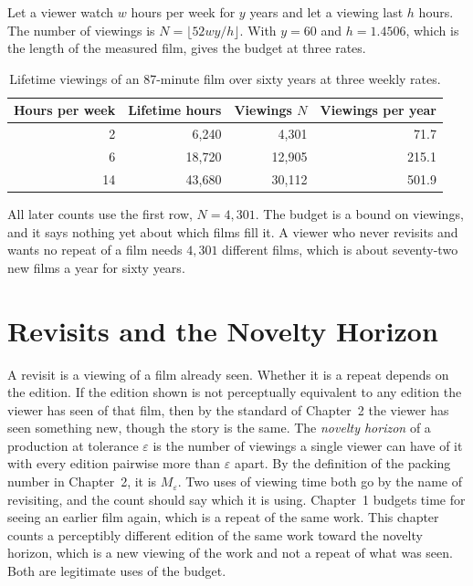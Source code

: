 \documentclass[11pt,twoside,openright]{book}
\theoremstyle{plain}
\theoremstyle{definition}
\theoremstyle{remark}
\begin{document}
Let a viewer watch $w$ hours per week for $y$ years and let a viewing last $h$ hours. The number of viewings is $N=\lfloor 52wy/h\rfloor$. With $y=60$ and $h=1.4506$, which is the length of the measured film,  gives the budget at three rates.

\begin{table}[ht]
\centering
\begin{tabular}{@{}rrrr@{}}
\toprule
Hours per week & Lifetime hours & Viewings $N$ & Viewings per year\\
\midrule
2 & 6{,}240 & 4{,}301 & 71.7\\
6 & 18{,}720 & 12{,}905 & 215.1\\
14 & 43{,}680 & 30{,}112 & 501.9\\
\bottomrule
\end{tabular}
\caption{Lifetime viewings of an 87-minute film over sixty years at three weekly rates.}\label{tab:budget13}
\end{table}

All later counts use the first row, $N=4{,}301$. The budget is a bound on viewings, and it says nothing yet about which films fill it. A viewer who never revisits and wants no repeat of a film needs $4{,}301$ different films, which is about seventy-two new films a year for sixty years.

\section{Revisits and the Novelty Horizon}\label{sec:horizon13}

A revisit is a viewing of a film already seen. Whether it is a repeat depends on the edition. If the edition shown is not perceptually equivalent to any edition the viewer has seen of that film, then by the standard of Chapter~2 the viewer has seen something new, though the story is the same. The \emph{novelty horizon} of a production at tolerance $\varepsilon$ is the number of viewings a single viewer can have of it with every edition pairwise more than $\varepsilon$ apart. By the definition of the packing number in Chapter~2, it is $M_\varepsilon$. Two uses of viewing time both go by the name of revisiting, and the count should say which it is using. Chapter~1 budgets time for seeing an earlier film again, which is a repeat of the same work. This chapter counts a perceptibly different edition of the same work toward the novelty horizon, which is a new viewing of the work and not a repeat of what was seen. Both are legitimate uses of the budget.
\end{document}

